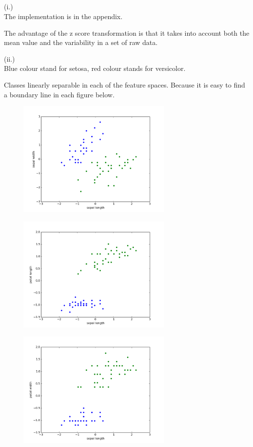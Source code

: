\documentclass{article} %
\begin{document}
\subsection{}
(i.) \\

The implementation is in the appendix.

The advantage of the z score transformation is that it takes into account both the mean value and the variability in a set of raw data.

(ii.) \\

Blue colour stand for setosa, red colour stands for versicolor.

Classes linearly separable in each of the feature spaces.  Because it is easy to find a boundary line in each figure below.

\begin{figure}[htbp] %
   \centering
   \includegraphics[width=3in]{img/figure1.png} 
\end{figure}

\begin{figure}[htbp] %
   \centering
   \includegraphics[width=3in]{img/figure2.png} 
\end{figure}

\begin{figure}[htbp] %
   \centering
   \includegraphics[width=3in]{img/figure3.png} 
\end{figure}
\end{document}
